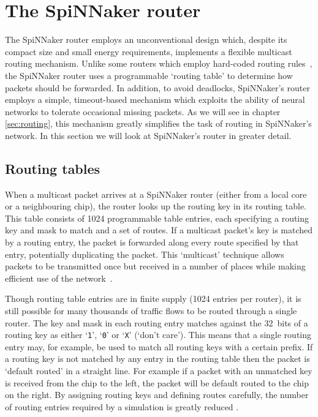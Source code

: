	\section{The SpiNNaker router}
		
		The SpiNNaker router employs an unconventional design which, despite its
		compact size and small energy requirements, implements a flexible multicast
		routing mechanism. Unlike some routers which employ hard-coded routing
		rules~\cite[chapter~8]{dally04}, the SpiNNaker router uses a programmable
		`routing table' to determine how packets should be forwarded. In addition,
		to avoid deadlocks, SpiNNaker's router employs a simple, timeout-based
		mechanism which exploits the ability of neural networks to tolerate
		occasional missing packets. As we will see in chapter \ref{sec:routing},
		this mechanism greatly simplifies the task of routing in SpiNNaker's
		network. In this section we will look at SpiNNaker's router in greater
		detail.
		
		\subsection{Routing tables}
		
			When a multicast packet arrives at a SpiNNaker router (either from a
			local core or a neighbouring chip), the router looks up the routing key
			in its routing table. This table consists of \num{1024} programmable
			table entries, each specifying a routing key and mask to match and a set
			of routes.  If a multicast packet's key is matched by a routing entry,
			the packet is forwarded along every route specified by that entry,
			potentially duplicating the packet. This `multicast' technique allows
			packets to be transmitted once but received in a number of places while
			making efficient use of the network~\cite{navaridas12}.
			
			Though routing table entries are in finite supply (\num{1024} entries per
			router), it is still possible for many thousands of traffic flows to be
			routed through a single router. The key and mask in each routing entry
			matches against the 32~bits of a routing key as either `\texttt{1}',
			`\texttt{0}' or `\texttt{X}' (`don't care').  This means that a single
			routing entry may, for example, be used to match all routing keys with a
			certain prefix. If a routing key is not matched by any entry in the
			routing table then the packet is `default routed' in a straight line. For
			example if a packet with an unmatched key is received from the chip to
			the left, the packet will be default routed to the chip on the right. By
			assigning routing keys and defining routes carefully, the number of
			routing entries required by a simulation is greatly reduced
			\cite{davies12}.
			
